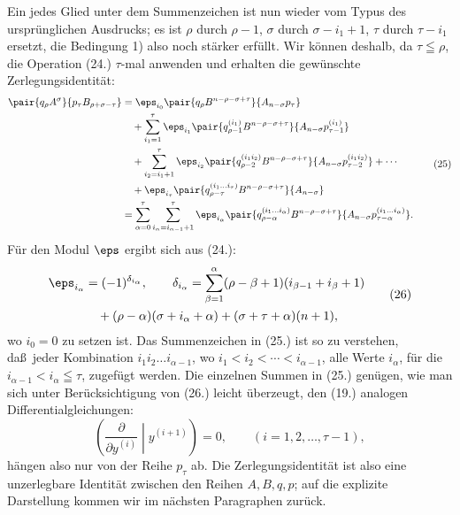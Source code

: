 Ein jedes Glied unter dem Summenzeichen ist nun wieder vom Typus des urspr\"unglichen Ausdrucks; es ist $\rho$ durch $\rho-1$, $\sigma$ durch $\sigma-i_1+1$, $\tau$ durch $\tau-i_1$ ersetzt, die Bedingung 1) also noch st\"arker erf\"ullt. Wir k\"onnen deshalb, da $\tau\leqq\rho$, die Operation (24.) $\tau$-mal anwenden und erhalten die gew\"unschte Zerlegungsidentit\"at:
\begin{equation}
\begin{aligned}
\pair{q_\rho A^\sigma}{p_\tau B_{\rho+\sigma-\tau}}
&=\eps_{i_0}\pair{q_\rho B^{n-\rho-\sigma+\tau}}{A_{n-\sigma}p_\tau}\\
&\quad+\sum_{i_1=1}^{\tau}\eps_{i_1}
 \pair{q_{\rho-1}^{(i_1)}B^{n-\rho-\sigma+\tau}}{A_{n-\sigma}p_{\tau-1}^{(i_1)}}\\
&\quad+\sum_{i_2=i_1+1}^{\tau}\eps_{i_2}
 \pair{q_{\rho-2}^{(i_1i_2)}B^{n-\rho-\sigma+\tau}}{A_{n-\sigma}p_{\tau-2}^{(i_1i_2)}}+\cdots\\
&\quad+\eps_{i_\tau}\pair{q_{\rho-\tau}^{(i_1\ldots i_\tau)}B^{n-\rho-\sigma+\tau}}{A_{n-\sigma}}\\
&=\sum_{\alpha=0}^{\tau}\sum_{i_\alpha=i_{\alpha-1}+1}^{\tau}\eps_{i_\alpha}
 \pair{q_{\rho-\alpha}^{(i_1\ldots i_\alpha)}B^{n-\rho-\sigma+\tau}}{A_{n-\sigma}p_{\tau-\alpha}^{(i_1\ldots i_\alpha)}}.
\end{aligned}
\tag{25}
\end{equation}
F\"ur den Modul $\eps$ ergibt sich aus (24.):
\begin{equation}
\begin{aligned}
\eps_{i_\alpha}&=(-1)^{\delta_{i_\alpha}},\qquad
\delta_{i_\alpha}=\sum_{\beta=1}^{\alpha}(\rho-\beta+1)(i_{\beta-1}+i_\beta+1)\\
&\quad +(\rho-\alpha)(\sigma+i_\alpha+\alpha)+(\sigma+\tau+\alpha)(n+1),
\end{aligned}
\tag{26}
\end{equation}
wo $i_0=0$ zu setzen ist. Das Summenzeichen in (25.) ist so zu verstehen, da\ss\ jeder Kombination $i_1i_2\ldots i_{\alpha-1}$, wo $i_1<i_2<\cdots<i_{\alpha-1}$, alle Werte $i_\alpha$, f\"ur die $i_{\alpha-1}<i_\alpha\leqq\tau$, zugef\"ugt werden. Die einzelnen Summen in (25.) gen\"ugen, wie man sich unter Ber\"ucksichtigung von (26.) leicht \"uberzeugt, den (19.) analogen Differentialgleichungen:
\begin{equation}
 \left(\frac{\partial}{\partial y^{(i)}}\middle|y^{(i+1)}\right)=0,
 \qquad (i=1,2,\ldots,\tau-1),
\tag{27}
\end{equation}
h\"angen also nur von der Reihe $p_\tau$ ab. Die Zerlegungsidentit\"at ist also eine unzerlegbare Identit\"at zwischen den Reihen $A,B,q,p$; auf die explizite Darstellung kommen wir im n\"achsten Paragraphen zur\"uck.
